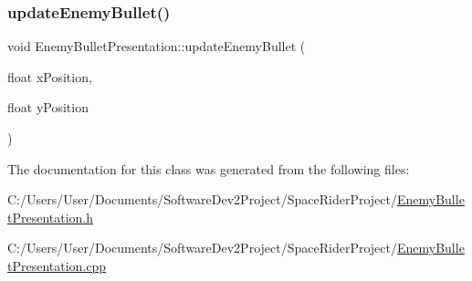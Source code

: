 \mbox{\label{class_enemy_bullet_presentation_a89cf545e80590e548f9f32dcce8edc98}} 
\subsubsection{\texorpdfstring{update\+Enemy\+Bullet()}{updateEnemyBullet()}}
{\footnotesize\ttfamily void Enemy\+Bullet\+Presentation\+::update\+Enemy\+Bullet (\begin{DoxyParamCaption}\item[{float}]{x\+Position,  }\item[{float}]{y\+Position }\end{DoxyParamCaption})}



The documentation for this class was generated from the following files\+:\begin{DoxyCompactItemize}
\item 
C\+:/\+Users/\+User/\+Documents/\+Software\+Dev2\+Project/\+Space\+Rider\+Project/\hyperlink{_enemy_bullet_presentation_8h}{Enemy\+Bullet\+Presentation.\+h}\item 
C\+:/\+Users/\+User/\+Documents/\+Software\+Dev2\+Project/\+Space\+Rider\+Project/\hyperlink{_enemy_bullet_presentation_8cpp}{Enemy\+Bullet\+Presentation.\+cpp}\end{DoxyCompactItemize}
